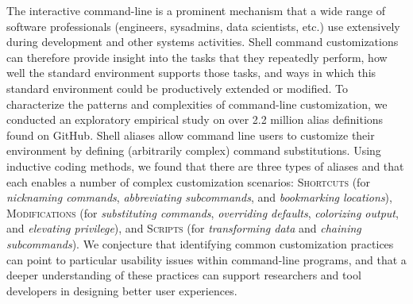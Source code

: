 The interactive command-line is a prominent mechanism that a wide range of software professionals (engineers, sysadmins, data scientists, etc.) use extensively during development and other systems activities. Shell command customizations can therefore provide insight into the tasks that they repeatedly perform, how well the standard environment supports those tasks, and ways in which this standard environment could be productively extended or modified.
To characterize the patterns and complexities of command-line customization, we conducted an exploratory empirical study on over 2.2 million alias definitions found on GitHub.
Shell aliases allow command line users to customize their environment by defining (arbitrarily complex) command substitutions.
Using inductive coding methods, we found that there are three types of aliases and that each enables a number of complex customization scenarios: 
\textsc{Shortcuts} (for \emph{nicknaming commands}, \emph{abbreviating subcommands}, and \emph{bookmarking locations}),
\textsc{Modifications} (for \emph{substituting commands}, \emph{overriding defaults}, \emph{colorizing output}, and \emph{elevating privilege}),
and \textsc{Scripts} (for \emph{transforming data} and \emph{chaining subcommands}).
We conjecture that identifying common customization practices can point to particular usability issues within command-line programs, and that a deeper understanding of these practices can support researchers and tool developers in designing better user experiences.